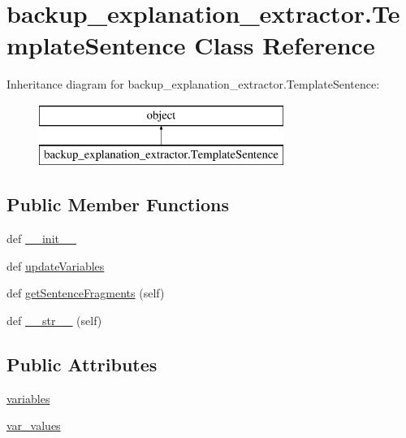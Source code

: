 \hypertarget{classbackup__explanation__extractor_1_1_template_sentence}{}\section{backup\+\_\+explanation\+\_\+extractor.\+Template\+Sentence Class Reference}
\label{classbackup__explanation__extractor_1_1_template_sentence}
Inheritance diagram for backup\+\_\+explanation\+\_\+extractor.\+Template\+Sentence\+:\begin{figure}[H]
\begin{center}
\leavevmode
\includegraphics[height=2.000000cm]{classbackup__explanation__extractor_1_1_template_sentence}
\end{center}
\end{figure}
\subsection*{Public Member Functions}
\begin{DoxyCompactItemize}
\item 
def \hyperlink{classbackup__explanation__extractor_1_1_template_sentence_a1db191174959f19602b3199d1caa6a4b}{\+\_\+\+\_\+init\+\_\+\+\_\+}
\item 
def \hyperlink{classbackup__explanation__extractor_1_1_template_sentence_a4ab1c8a6d9cc06a315ef02420e7a5a9b}{update\+Variables}
\item 
def \hyperlink{classbackup__explanation__extractor_1_1_template_sentence_acc85504f52495bbb1e7e22c787589b37}{get\+Sentence\+Fragments} (self)
\item 
def \hyperlink{classbackup__explanation__extractor_1_1_template_sentence_ac481b85b539ff4e7a4c6ba39f692f5e7}{\+\_\+\+\_\+str\+\_\+\+\_\+} (self)
\end{DoxyCompactItemize}
\subsection*{Public Attributes}
\begin{DoxyCompactItemize}
\item 
\hyperlink{classbackup__explanation__extractor_1_1_template_sentence_a93b369f2650a022bc2340e927dab09af}{variables}
\item 
\hyperlink{classbackup__explanation__extractor_1_1_template_sentence_a74037e8f3e59f7c69d3ff5250679a097}{var\+\_\+values}
\end{DoxyCompactItemize}


